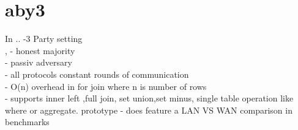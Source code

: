 \section{aby3}
In \cite{10.1145/3372297.3423358} ..
-3 Party setting \\, 
- honest majority \\ 
- passiv adversary \\
- all protocols constant rounds of communication \\
- O(n) overhead in for join where n is number of rows \\
- supports inner left ,full join, set union,set minus, single table operation like where or aggregate. prototype 
- does feature a LAN VS WAN comparison in benchmarks

  